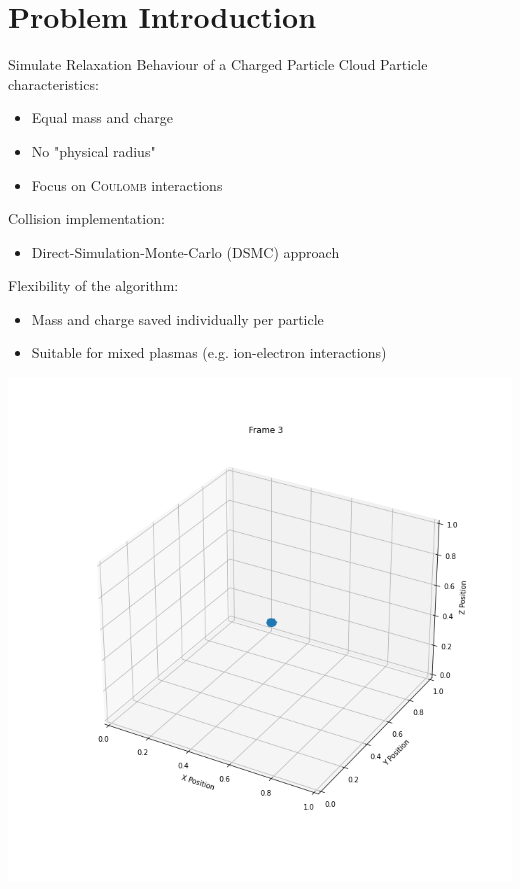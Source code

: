 
\section{Problem Introduction}

\begin{frame}{} %
    \begin{block}{Simulate Relaxation Behaviour of a Charged Particle Cloud}
        Particle characteristics:
        \begin{itemize}
            \item Equal mass and charge
            \item No "physical radius"
            \item Focus on \textsc{Coulomb} interactions
        \end{itemize}
        Collision implementation:
        \begin{itemize}
            \item Direct-Simulation-Monte-Carlo (DSMC) approach
        \end{itemize}
        Flexibility of the algorithm:
        \begin{itemize}
            \item Mass and charge saved individually per particle
            \item Suitable for mixed plasmas (e.g. ion-electron interactions)
        \end{itemize}
    \end{block}
    \begin{minipage}[c]{\textwidth}
        \centering
        \begin{minipage}{0.25\textwidth}
            \includegraphics[width=\textwidth]{ressources/particle_expansion/position_2.png}

\end{minipage}
\end{minipage}
\end{frame}
